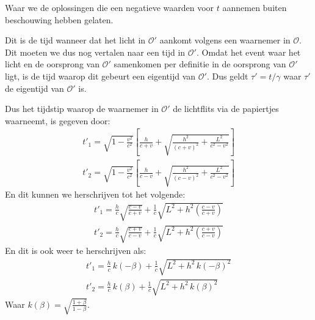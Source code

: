 \documentclass[12pt, dutch, a4paper]{article}
\begin{document}
\begin{enumerate}[(a).]
    Waar we de oplossingen die een negatieve waarden voor $t$ aannemen buiten beschouwing
    hebben gelaten.

    Dit is de tijd wanneer dat het licht in $\mathcal{O}'$ aankomt volgens een waarnemer in $\mathcal{O}$.
    Dit moeten we dus nog vertalen naar een tijd in $\mathcal{O}'$.
    Omdat het event waar het licht en de oorsprong van $\mathcal{O}'$ samenkomen per definitie
    in de oorsprong van $\mathcal{O}'$ ligt, 
    is de tijd waarop dit gebeurt een eigentijd van $\mathcal{O}'$.
    Dus geldt $\tau' = t / \gamma$ waar $\tau'$ de eigentijd van $\mathcal{O}'$ is.
    
    Dus het tijdstip waarop de waarnemer in $\mathcal{O}'$
    de lichtflits via de papiertjes waarneemt, is gegeven door:
    \begin{equation}
        \begin{split}
            t'_1 = \sqrt{1 - \frac{v^2}{c^2}} \left[\frac{h}{c + v} +
            \sqrt{\frac{h^{2}}{\left(c + v\right)^{2}}+\frac{L^{2}}{c^{2}- v^{2}}}\right]\\
            t'_2 = \sqrt{1 - \frac{v^2}{c^2}} \left[\frac{h}{c-v}+
            \sqrt{\frac{h^{2}}{\left(c-v\right)^{2}}+\frac{L^{2}}{c^{2}-v^{2}}}\right]
        \end{split}
    \end{equation}
    En dit kunnen we herschrijven tot het volgende:
    \begin{equation}
        \begin{split}
            t'_1 = \frac{h}{c}\sqrt{\frac{c-v}{c+v}}+
            \frac{1}{c}\sqrt{L^{2} + h^{2}\left(\frac{c-v}{c+v}\right)}\\
            t'_2 = \frac{h}{c}\sqrt{\frac{c+v}{c-v}}+
            \frac{1}{c}\sqrt{L^{2} + h^{2}\left(\frac{c+v}{c-v}\right)}
        \end{split}
    \end{equation}
    En dit is ook weer te herschrijven als:
    \begin{equation}
        \begin{split}
            t'_1 = \frac{h}{c} \, k(-\beta)+
            \frac{1}{c}\sqrt{L^{2} + h^2\,k(-\beta)^2}\\
            t'_2 = \frac{h}{c} \, k(\beta)+
            \frac{1}{c}\sqrt{L^{2} + h^2\,k(\beta)^2}
        \end{split}
    \end{equation}
    Waar $k(\beta) = \sqrt{\frac{1+\beta}{1-\beta}}$.


\end{enumerate}
\end{document}
